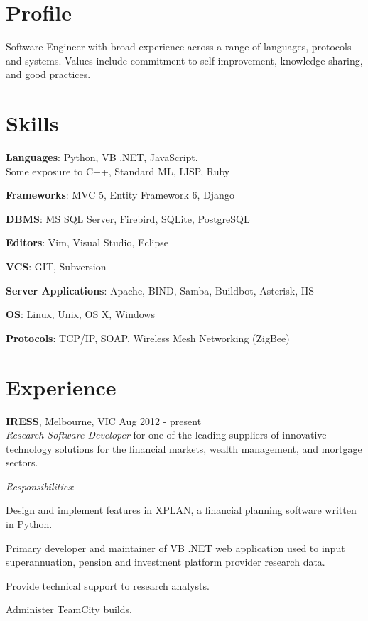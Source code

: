 \documentclass[line,margin]{res}
\begin{document}
    \address{ablack@fastmail.net}
    \address{0401 868 343}

    \begin{resume}
        \section{Profile}
        Software Engineer with broad experience across a range of languages, protocols and systems.
        Values include commitment to self improvement, knowledge sharing, and good practices.
            
        \section{Skills}
        \begin{list}{}{\leftmargin=1em \itemsep=-2pt}
            \item{\textbf{Languages}: Python, VB .NET, JavaScript.\\
                Some exposure to C++, Standard ML, LISP, Ruby}
            \item{\textbf{Frameworks}: MVC 5, Entity Framework 6, Django}
            \item{\textbf{DBMS}: MS SQL Server, Firebird, SQLite, PostgreSQL}
            \item{\textbf{Editors}: Vim, Visual Studio, Eclipse}
            \item{\textbf{VCS}: GIT, Subversion}
            \item{\textbf{Server Applications}: Apache, BIND, Samba, Buildbot, Asterisk, IIS}
            \item{\textbf{OS}: Linux, Unix, OS X, Windows}
            \item{\textbf{Protocols}: TCP/IP, SOAP, Wireless Mesh Networking (ZigBee)}
        \end{list}

        \section{Experience}
        \textbf{IRESS}, Melbourne, VIC \hfill Aug 2012 - present \\
        \textit{Research Software Developer} for one of the leading suppliers of innovative technology
        solutions for the financial markets, wealth management, and mortgage sectors.

        \textit{Responsibilities}:
        \begin{list}{}{\leftmargin=1em \itemsep=-2pt}
            \item{Design and implement features in XPLAN, a financial planning software written in Python.}
            \item{Primary developer and maintainer of VB .NET web application used to input superannuation,
            pension and investment platform provider research data.}
            \item{Provide technical support to research analysts.}
            \item{Administer TeamCity builds.}
        \end{list}


\end{resume}
\end{document}
